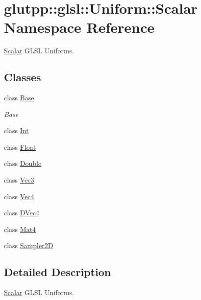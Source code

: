 \hypertarget{namespaceglutpp_1_1glsl_1_1Uniform_1_1Scalar}{\section{glutpp\-:\-:glsl\-:\-:\-Uniform\-:\-:\-Scalar \-Namespace \-Reference}
\label{namespaceglutpp_1_1glsl_1_1Uniform_1_1Scalar}
}


\hyperlink{namespaceglutpp_1_1glsl_1_1Uniform_1_1Scalar}{\-Scalar} \-G\-L\-S\-L \-Uniforms.  


\subsection*{\-Classes}
\begin{DoxyCompactItemize}
\item 
class \hyperlink{classglutpp_1_1glsl_1_1Uniform_1_1Scalar_1_1Base}{\-Base}
\begin{DoxyCompactList}\small\item\em \-Base \end{DoxyCompactList}\item 
class \hyperlink{classglutpp_1_1glsl_1_1Uniform_1_1Scalar_1_1Int}{\-Int}
\item 
class \hyperlink{classglutpp_1_1glsl_1_1Uniform_1_1Scalar_1_1Float}{\-Float}
\item 
class \hyperlink{classglutpp_1_1glsl_1_1Uniform_1_1Scalar_1_1Double}{\-Double}
\item 
class \hyperlink{classglutpp_1_1glsl_1_1Uniform_1_1Scalar_1_1Vec3}{\-Vec3}
\item 
class \hyperlink{classglutpp_1_1glsl_1_1Uniform_1_1Scalar_1_1Vec4}{\-Vec4}
\item 
class \hyperlink{classglutpp_1_1glsl_1_1Uniform_1_1Scalar_1_1DVec4}{\-D\-Vec4}
\item 
class \hyperlink{classglutpp_1_1glsl_1_1Uniform_1_1Scalar_1_1Mat4}{\-Mat4}
\item 
class \hyperlink{classglutpp_1_1glsl_1_1Uniform_1_1Scalar_1_1Sampler2D}{\-Sampler2\-D}
\end{DoxyCompactItemize}


\subsection{\-Detailed \-Description}
\hyperlink{namespaceglutpp_1_1glsl_1_1Uniform_1_1Scalar}{\-Scalar} \-G\-L\-S\-L \-Uniforms. 